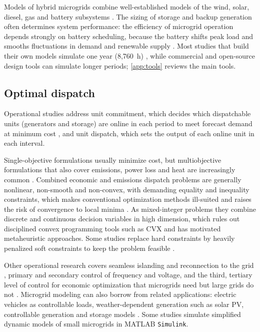 \documentclass[final,3p,times]{elsarticle}
\begin{document}
Models of hybrid microgrids combine well-established models of the wind, solar, diesel, gas and battery subsystems \cite{bhandari2014}. The sizing of storage and backup generation often determines system performance: the efficiency of microgrid operation depends strongly on battery scheduling, because the battery shifts peak load and smooths fluctuations in demand and renewable supply \cite{gu2014}. Most studies that build their own models simulate one year (8,760~h) \cite{logenthiran2010}, while commercial and open-source design tools can simulate longer periods; \cref{app:tools} reviews the main tools.

\subsection{Optimal dispatch}

Operational studies address unit commitment, which decides which dispatchable units (generators and storage) are online in each period to meet forecast demand at minimum cost \cite{saravanan2013}, and unit dispatch, which sets the output of each online unit in each interval.

Single-objective formulations usually minimize cost, but multiobjective formulations that also cover emissions, power loss and heat are increasingly common \cite{pathak2017}. Combined economic and emissions dispatch problems are generally nonlinear, non-smooth and non-convex, with demanding equality and inequality constraints, which makes conventional optimization methods ill-suited and raises the risk of convergence to local minima \cite{pathak2017}. As mixed-integer problems they combine discrete and continuous decision variables in high dimension, which rules out disciplined convex programming tools such as CVX and has motivated metaheuristic approaches. Some studies replace hard constraints by heavily penalized soft constraints to keep the problem feasible \cite{zachar2016}.

Other operational research covers seamless islanding and reconnection to the grid \cite{mg_review}, primary and secondary control of frequency and voltage, and the third, tertiary level of control for economic optimization that microgrids need but large grids do not \cite{mg_review}. Microgrid modeling can also borrow from related applications: electric vehicles as controllable loads, weather-dependent generation such as solar PV, controllable generation and storage models \cite{mg_mod_opt}. Some studies simulate simplified dynamic models of small microgrids in MATLAB \texttt{Simulink}.
\end{document}
